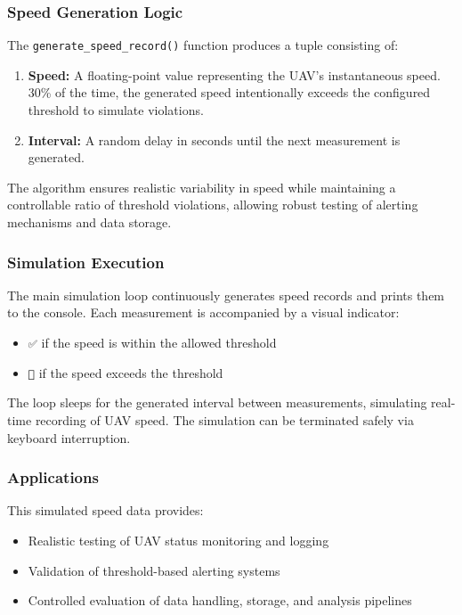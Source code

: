 \subsubsection{Speed Generation Logic}

The \texttt{generate\_speed\_record()} function produces a tuple consisting of:

\begin{enumerate}
    \item \textbf{Speed:} A floating-point value representing the UAV's instantaneous speed. 30\% of the time, the generated speed intentionally exceeds the configured threshold to simulate violations.
    \item \textbf{Interval:} A random delay in seconds until the next measurement is generated.
\end{enumerate}

The algorithm ensures realistic variability in speed while maintaining a controllable ratio of threshold violations, allowing robust testing of alerting mechanisms and data storage.

\subsubsection{Simulation Execution}

The main simulation loop continuously generates speed records and prints them to the console. Each measurement is accompanied by a visual indicator:

\begin{itemize}
    \item \texttt{✅} if the speed is within the allowed threshold
    \item \texttt{🚨} if the speed exceeds the threshold
\end{itemize}

The loop sleeps for the generated interval between measurements, simulating real-time recording of UAV speed. The simulation can be terminated safely via keyboard interruption.

\subsubsection{Applications}

This simulated speed data provides:

\begin{itemize}
    \item Realistic testing of UAV status monitoring and logging
    \item Validation of threshold-based alerting systems
    \item Controlled evaluation of data handling, storage, and analysis pipelines
\end{itemize}

